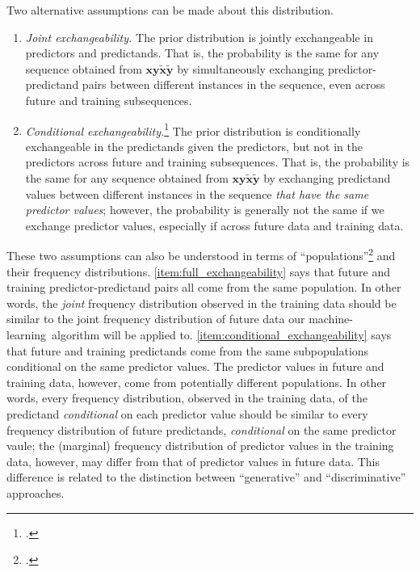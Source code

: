 \documentclass[\ifafour a4paper,12pt,\else a5paper,10pt,\fi%
onecolumn,oneside,article,%
british%
]{memoir}
\theoremstyle{remark}
\theoremstyle{innote}
\newcommand*{\citep}{\footcites}
\renewcommand*{\|}[1][]{\nonscript\:#1\vert\nonscript\:\mathopen{}}
\newcommand*{\sect}{\S}%
\newcommand*{\ml}{machine-learning}
\newcommand*{\bz}{\bm{xy}}
\newcommand*{\bzz}{\tilde{\bm{x}}\tilde{\bm{y}}}
\begin{document}
Two alternative assumptions can be made about this distribution.
\begin{enumerate}[label=(\Roman*),para]
\item\label{item:full_exchangeability} \emph{Joint exchangeability.} The
  prior distribution is jointly exchangeable in predictors and predictands.
  That is, the probability is the same for any sequence obtained from
  $\bz\bzz$ by simultaneously exchanging predictor-predictand pairs between
  different instances in the sequence, even across future and training
  subsequences.
\item\label{item:conditional_exchangeability} \emph{Conditional
    exchangeability.}\citep[\sect~4.6.2]{bernardoetal1994_r2000}[\sect~3]{diaconis1988}[\sect~3,
  Appendix~2]{lindleyetal1981} The prior distribution is conditionally
  exchangeable in the predictands given the predictors, but not in the
  predictors across future and training subsequences. That is, the
  probability is the same for any sequence obtained from $\bz\bzz$ by
  exchanging predictand values between different instances in the sequence
  \emph{that have the same predictor values}; however, the probability is
  generally not the same if we exchange predictor values, especially if
  across future data and training data.
\end{enumerate}

These two assumptions can also be understood in terms of
\enquote{populations}\citep[see the extremely insightful discussion
in][]{lindleyetal1981} and their frequency distributions.
\ref{item:full_exchangeability} says that future and training
predictor-predictand pairs all come from the same population. In other
words, the \emph{joint} frequency distribution observed in the training
data should be similar to the joint frequency distribution of future data
our \ml\ algorithm will be applied to.
\ref{item:conditional_exchangeability} says that future and training
predictands come from the same subpopulations conditional on the same
predictor values. The predictor values in future and training data,
however, come from potentially different populations. In other words, every
frequency distribution, observed in the training data, of the predictand
\emph{conditional} on each predictor value should be similar to every
frequency distribution of future predictands, \emph{conditional} on the
same predictor vaule; the (marginal) frequency distribution of predictor
values in the training data, however, may differ from that of predictor
values in future data. This difference is related to the distinction
between \enquote{generative} and \enquote{discriminative} approaches.
\end{document}
